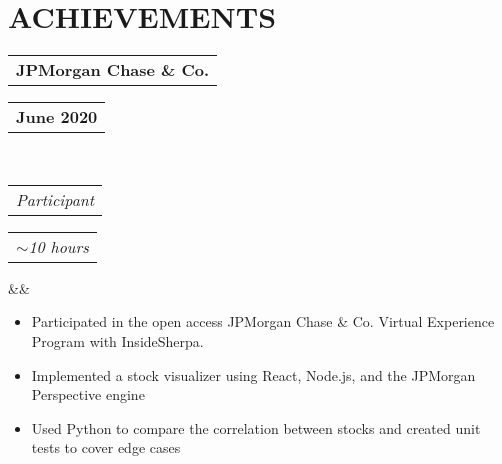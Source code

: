 \documentclass[11pt,letterpaper,sans]{moderncv}        %
\makeatletter
\newcommand*{\customcventry}[7][.25em]{
  \begin{tabular}{@{}l} 
    {\bfseries #4}
  \end{tabular}
  \hfill%
  \begin{tabular}{l@{}}
     {\bfseries #5}
  \end{tabular} \\
  \begin{tabular}{@{}l} 
    {\itshape #3}
  \end{tabular}
  \hfill%
  \begin{tabular}{l@{}}
     {\itshape #2}
  \end{tabular}
  \ifx&#7&%
  \else{\\%
    \begin{minipage}{\maincolumnwidth}%
      #7%
    \end{minipage}}\fi%
  \par\addvspace{#1}}
\makeatother
\begin{document}
\vspace*{-4mm}

\section{ACHIEVEMENTS}
\customcventry{\small{$\sim$10 hours}}{\small{Participant}}{JPMorgan Chase \& Co.}{June 2020}{e}{}
\begin{itemize}
    \item Participated in the open access JPMorgan Chase \& Co. Virtual Experience Program with InsideSherpa.
    \item Implemented a stock visualizer using React, Node.js, and the JPMorgan Perspective engine
    \item Used Python to compare the correlation between stocks and created unit tests to cover edge cases
\end{itemize}

\nocite{*}



\end{document}
